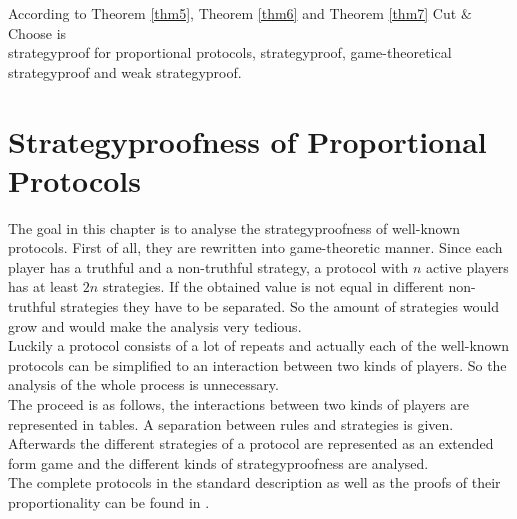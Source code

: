 \begin{bezeichnungen}
According to Theorem \ref{thm5}, Theorem \ref{thm6} and Theorem \ref{thm7} Cut $\&$ Choose is\\strategyproof for proportional protocols, strategyproof, game-theoretical strategyproof and weak strategyproof.
\end{bezeichnungen}
\pagebreak
\section{Strategyproofness of Proportional Protocols}
The goal in this chapter is to analyse the strategyproofness of well-known protocols. First of all, they are rewritten into game-theoretic manner. Since each player has a truthful and a non-truthful strategy, a protocol with $n$ active players has at least $2n$ strategies. If the obtained value is not equal in different non-truthful strategies they have to be separated. So the amount of strategies would grow and would make the analysis very tedious.\\Luckily a protocol consists of a lot of repeats and actually each of the well-known protocols can be simplified to an interaction between two kinds of players. So the analysis of the whole process is unnecessary.\\
The proceed is as follows, the interactions between two kinds of players are represented in tables. A separation between rules and strategies is given. Afterwards the different strategies of a protocol are represented as an extended form game and the different kinds of strategyproofness are analysed.\\
The complete protocols in the standard description as well as the proofs of their proportionality can be found in \cite{robertson:cake-cutting}.
